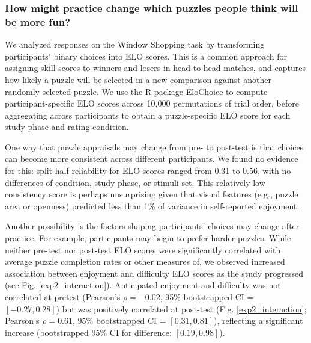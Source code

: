 \documentclass[10pt,letterpaper]{article}
\newcommand{\jc}[1]{{\color{purple}JC: #1}}
\begin{document}
\subsubsection{How might practice change which puzzles people think will be more fun?}

We analyzed responses on the Window Shopping task by transforming participants' binary choices into ELO scores. This is a common approach for assigning skill scores to winners and losers in head-to-head matches, and captures how likely a puzzle will be selected in a new comparison against another randomly selected puzzle. %
We use the R package EloChoice \cite{Clark2018} to compute participant-specific ELO scores across 10,000 permutations of trial order, before aggregating across participants to obtain a puzzle-specific ELO score for each study phase and rating condition. 

One way that puzzle appraisals may change from pre- to post-test is that choices can become more consistent across different participants. We found no evidence for this: split-half reliability for ELO scores ranged from 0.31 to 0.56, with no differences of condition, study phase, or stimuli set. This relatively low consistency score is perhaps unsurprising given that visual features (e.g., puzzle area or openness) predicted less than 1\% of variance in self-reported enjoyment.

Another possibility is the factors shaping participants' choices may change after practice. For example, participants may begin to prefer harder puzzles. While neither pre-test nor post-test ELO scores were significantly correlated with average puzzle completion rates or other measures of, we observed increased association between enjoyment and difficulty ELO scores as the study progressed (see Fig. \ref{exp2_interaction}). Anticipated enjoyment and difficulty was not correlated at pretest (Pearson's $\rho=-0.02$, 95\% bootstrapped CI = $[-0.27, 0.28]$) but was positively correlated at post-test (Fig. \ref{exp2_interaction}; Pearson's $\rho = 0.61$, 95\% bootstrapped CI = $[0.31, 0.81]$), reflecting a significant increase (bootstrapped 95\% CI for difference: $[0.19, 0.98]$). 
\end{document}
